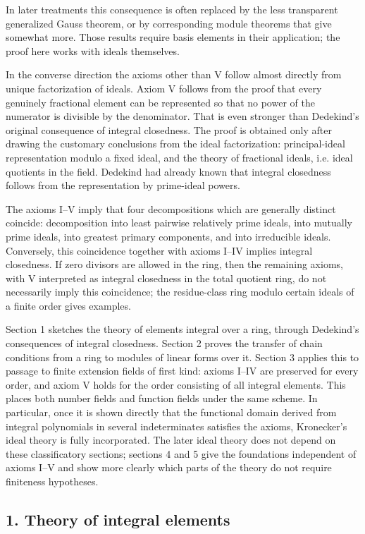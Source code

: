 \documentclass[12pt]{article}
\begin{document}
In later treatments this consequence is often replaced by the less transparent generalized Gauss theorem, or by corresponding module theorems that give somewhat more. Those results require basis elements in their application; the proof here works with ideals themselves.

In the converse direction the axioms other than V follow almost directly from unique factorization of ideals. Axiom V follows from the proof that every genuinely fractional element can be represented so that no power of the numerator is divisible by the denominator. That is even stronger than Dedekind's original consequence of integral closedness. The proof is obtained only after drawing the customary conclusions from the ideal factorization: principal-ideal representation modulo a fixed ideal, and the theory of fractional ideals, i.e. ideal quotients in the field. Dedekind had already known that integral closedness follows from the representation by prime-ideal powers.

The axioms I--V imply that four decompositions which are generally distinct coincide: decomposition into least pairwise relatively prime ideals, into mutually prime ideals, into greatest primary components, and into irreducible ideals. Conversely, this coincidence together with axioms I--IV implies integral closedness. If zero divisors are allowed in the ring, then the remaining axioms, with V interpreted as integral closedness in the total quotient ring, do not necessarily imply this coincidence; the residue-class ring modulo certain ideals of a finite order gives examples.

Section 1 sketches the theory of elements integral over a ring, through Dedekind's consequences of integral closedness. Section 2 proves the transfer of chain conditions from a ring to modules of linear forms over it. Section 3 applies this to passage to finite extension fields of first kind: axioms I--IV are preserved for every order, and axiom V holds for the order consisting of all integral elements. This places both number fields and function fields under the same scheme. In particular, once it is shown directly that the functional domain derived from integral polynomials in several indeterminates satisfies the axioms, Kronecker's ideal theory is fully incorporated. The later ideal theory does not depend on these classificatory sections; sections 4 and 5 give the foundations independent of axioms I--V and show more clearly which parts of the theory do not require finiteness hypotheses.

\subsection{1. Theory of integral elements}
\end{document}
